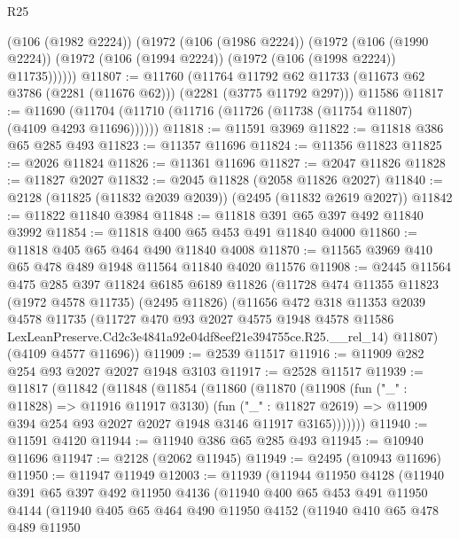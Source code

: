 \begin{lexlean}{R25}
\begin{coremodule}
        (@106 (@1982 @2224))
        (@1972
          (@106 (@1986 @2224))
          (@1972
            (@106 (@1990 @2224))
            (@1972 (@106 (@1994 @2224)) (@1972 (@106 (@1998 @2224)) @11735))))))
@11807 := @11760
    (@11764 @11792 @62 @11733 (@11673 @62 @3786 (@2281 (@11676 @62))) (@2281 (@3775 @11792 @297)))
    @11586
@11817 := @11690 (@11704 (@11710 (@11716 (@11726 (@11738 (@11754 @11807) (@4109 @4293 @11696))))))
@11818 := @11591 @3969
@11822 := @11818 @386 @65 @285 @493
@11823 := @11357 @11696
@11824 := @11356 @11823
@11825 := @2026 @11824
@11826 := @11361 @11696
@11827 := @2047 @11826
@11828 := @11827 @2027
@11832 := @2045 @11828 (@2058 @11826 @2027)
@11840 := @2128 (@11825 (@11832 @2039 @2039)) (@2495 (@11832 @2619 @2027))
@11842 := @11822 @11840 @3984
@11848 := @11818 @391 @65 @397 @492 @11840 @3992
@11854 := @11818 @400 @65 @453 @491 @11840 @4000
@11860 := @11818 @405 @65 @464 @490 @11840 @4008
@11870 := @11565 @3969 @410 @65 @478 @489 @1948 @11564 @11840 @4020 @11576
@11908 := @2445
    @11564
    @475
    @285
    @397
    @11824
    @6185
    @6189
    @11826
    (@11728
      @474
      @11355
      @11823
      (@1972 @4578 @11735)
      (@2495 @11826)
      (@11656
        @472
        @318
        @11353
        @2039
        @4578
        @11735
        (@11727
          @470
          @93
          @2027
          @4575
          @1948
          @4578
          @11586
          LexLeanPreserve.Cd2c3e4841a92e04df8eef21e394755ce.R25.__rel_14)
        @11807)
      (@4109 @4577 @11696))
@11909 := @2539 @11517
@11916 := @11909 @282 @254 @93 @2027 @2027 @1948 @3103
@11917 := @2528 @11517
@11939 := @11817
    (@11842
      (@11848
        (@11854
          (@11860
            (@11870
              (@11908
                (fun ("_" : @11828) => @11916 @11917 @3130)
                (fun ("_" : @11827 @2619) =>
                @11909 @394 @254 @93 @2027 @2027 @1948 @3146 @11917 @3165)))))))
@11940 := @11591 @4120
@11944 := @11940 @386 @65 @285 @493
@11945 := @10940 @11696
@11947 := @2128 (@2062 @11945)
@11949 := @2495 (@10943 @11696)
@11950 := @11947 @11949
@12003 := @11939
    (@11944
      @11950
      @4128
      (@11940
        @391
        @65
        @397
        @492
        @11950
        @4136
        (@11940
          @400
          @65
          @453
          @491
          @11950
          @4144
          (@11940
            @405
            @65
            @464
            @490
            @11950
            @4152
            (@11940
              @410
              @65
              @478
              @489
              @11950

\end{coremodule}
\end{lexlean}

